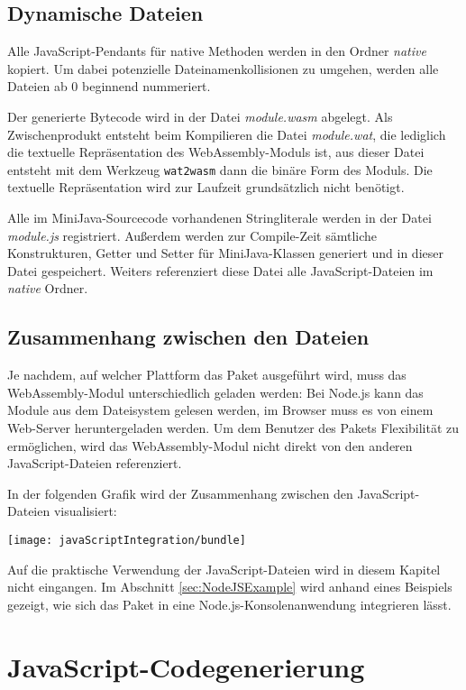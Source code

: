 \subsection{Dynamische Dateien}

Alle JavaScript-Pendants für native Methoden werden in den Ordner \emph{native} kopiert. Um dabei potenzielle Dateinamenkollisionen zu umgehen, werden alle Dateien ab 0 beginnend nummeriert.

Der generierte Bytecode wird in der Datei \emph{module.wasm} abgelegt. Als Zwischenprodukt entsteht beim Kompilieren die Datei \emph{module.wat}, die lediglich die textuelle Repräsentation des WebAssembly-Moduls ist, aus dieser Datei entsteht mit dem Werkzeug \lstinline{wat2wasm}\cite{WABT} dann die binäre Form des Moduls. Die textuelle Repräsentation wird zur Laufzeit grundsätzlich nicht benötigt.

Alle im MiniJava-Sourcecode vorhandenen Stringliterale werden in der Datei \emph{module.js} registriert. Außerdem werden zur Compile-Zeit sämtliche Konstrukturen, Getter und Setter für MiniJava-Klassen generiert und in dieser Datei gespeichert. Weiters referenziert diese Datei alle JavaScript-Dateien im \emph{native} Ordner.

\subsection{Zusammenhang zwischen den Dateien}

Je nachdem, auf welcher Plattform das Paket ausgeführt wird, muss das WebAssembly-Modul unterschiedlich geladen werden: Bei Node.js kann das Module aus dem Dateisystem gelesen werden, im Browser muss es von einem Web-Server heruntergeladen werden. Um dem Benutzer des Pakets  Flexibilität zu ermöglichen, wird das WebAssembly-Modul nicht direkt von den anderen JavaScript-Dateien referenziert.

In der folgenden Grafik wird der Zusammenhang zwischen den JavaScript-Dateien visualisiert:

\begin{center}
    \texttt{[image: javaScriptIntegration/bundle]}
\end{center}

Auf die praktische Verwendung der JavaScript-Dateien wird in diesem Kapitel nicht eingangen. Im Abschnitt \ref{sec:NodeJSExample} wird anhand eines Beispiels gezeigt, wie sich das Paket in eine Node.js-Konsolenanwendung integrieren lässt.

\section{JavaScript-Codegenerierung}


